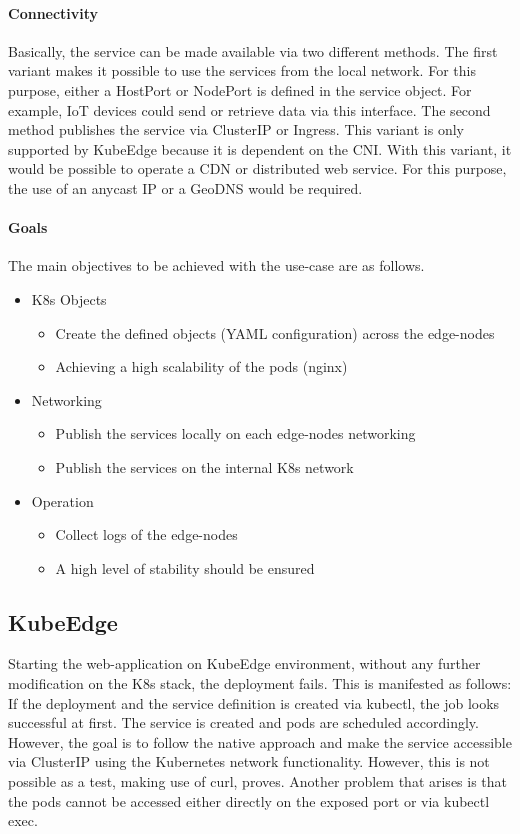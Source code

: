 \documentclass[MSC,Master,english]{twbook}%
\begin{document}
\paragraph{Connectivity} Basically, the service can be made available via two different methods. The first variant makes it possible to use the services from the local network. For this purpose, either a HostPort or NodePort is defined in the service object. For example, IoT devices could send or retrieve data via this interface. The second method publishes the service via ClusterIP or Ingress. This variant is only supported by KubeEdge because it is dependent on the \ac{CNI}. With this variant, it would be possible to operate a CDN or distributed web service. For this purpose, the use of an anycast IP or a GeoDNS would be required.

\paragraph{Goals} The main objectives to be achieved with the use-case are as follows.
\begin{itemize}
    \item \ac{K8s} Objects
    \begin{itemize}
        \item Create the defined objects (YAML configuration) across the edge-nodes
        \item Achieving a high scalability of the pods (nginx)
    \end{itemize}
    \item Networking
    \begin{itemize}
        \item Publish the services locally on each edge-nodes networking
        \item Publish the services on the internal \ac{K8s} network
    \end{itemize}
    \item Operation
    \begin{itemize}
        \item Collect logs of the edge-nodes
        \item A high level of stability should be ensured
    \end{itemize}
\end{itemize}

\subsection{KubeEdge} 
\label{sec:ke-usecase}
Starting the web-application on KubeEdge environment, without any further modification on the \ac{K8s} stack, the deployment fails. This is manifested as follows: If the deployment and the service definition is created via kubectl, the job looks successful at first. The service is created and pods are scheduled accordingly. However, the goal is to follow the native approach and make the service accessible via ClusterIP using the Kubernetes network functionality. However, this is not possible as a test, making use of curl, proves. Another problem that arises is that the pods cannot be accessed either directly on the exposed port or via kubectl exec.
\end{document}
